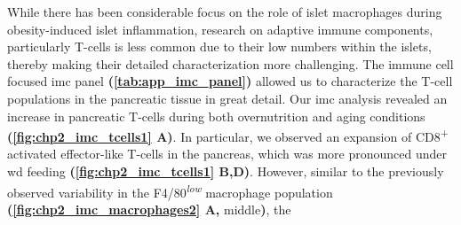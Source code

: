 While there has been considerable focus on the role of islet macrophages during obesity-induced islet inflammation, research on adaptive immune components, particularly T-cells is less common due to their low numbers within the islets, thereby making their detailed characterization more challenging. The immune cell focused \gls{imc} panel \textbf{(\autoref{tab:app_imc_panel})} allowed us to characterize the T-cell populations in the pancreatic tissue in great detail. Our \gls{imc} analysis revealed an increase in pancreatic T-cells during both overnutrition and aging conditions \textbf{(\autoref{fig:chp2_imc_tcells1} A)}. In particular, we observed an expansion of CD8\textsuperscript{+} activated effector-like T-cells in the pancreas, which was more pronounced under \gls{wd} feeding \textbf{(\autoref{fig:chp2_imc_tcells1} B,D)}. However, similar to the previously observed variability in the F4/80\textsuperscript{\textit{low}} macrophage population \textbf{(\autoref{fig:chp2_imc_macrophages2} A,} middle\textbf{)}, the 


